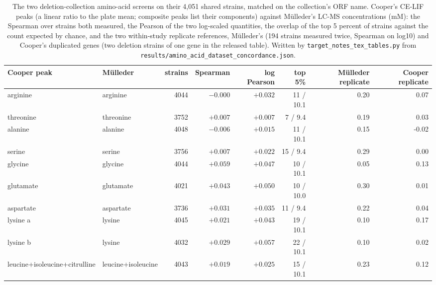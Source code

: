 \begin{table}[H]
  \centering
  \footnotesize
  \caption[M\"ulleder 2016 against Cooper 2010]{The two deletion-collection amino-acid screens on their 4,051 shared strains, matched on the collection's ORF name. Cooper's CE-LIF peaks (a linear ratio to the plate mean; composite peaks list their components) against M\"ulleder's LC-MS concentrations (mM): the Spearman over strains both measured, the Pearson of the two log-scaled quantities, the overlap of the top 5 percent of strains against the count expected by chance, and the two within-study replicate references, M\"ulleder's (194 strains measured twice, Spearman on log10) and Cooper's duplicated genes (two deletion strains of one gene in the released table). Written by \texttt{target\_notes\_tex\_tables.py} from \texttt{results/amino\_acid\_dataset\_concordance.json}.}
  \label{tab:amino-acid-concordance}
  \begin{tabular}{@{}llrrrrrr@{}}
    \hline
    Cooper peak & M\"ulleder & strains & Spearman & log Pearson & top 5\% & M\"ulleder replicate & Cooper replicate \\
    \hline
    arginine & arginine & 4044 & $-0.000$ & $+0.032$ & 11 / 10.1 & 0.20 & 0.07 \\
    threonine & threonine & 3752 & $+0.007$ & $+0.007$ & 7 / 9.4 & 0.19 & 0.03 \\
    alanine & alanine & 4048 & $-0.006$ & $+0.015$ & 11 / 10.1 & 0.15 & -0.02 \\
    serine & serine & 3756 & $+0.007$ & $+0.022$ & 15 / 9.4 & 0.29 & 0.00 \\
    glycine & glycine & 4044 & $+0.059$ & $+0.047$ & 10 / 10.1 & 0.05 & 0.13 \\
    glutamate & glutamate & 4021 & $+0.043$ & $+0.050$ & 10 / 10.0 & 0.30 & 0.01 \\
    aspartate & aspartate & 3736 & $+0.031$ & $+0.035$ & 11 / 9.4 & 0.22 & 0.04 \\
    lysine a & lysine & 4045 & $+0.021$ & $+0.043$ & 19 / 10.1 & 0.10 & 0.17 \\
    lysine b & lysine & 4032 & $+0.029$ & $+0.057$ & 22 / 10.1 & 0.10 & 0.02 \\
    leucine+isoleucine+citrulline & leucine+isoleucine & 4043 & $+0.019$ & $+0.025$ & 15 / 10.1 & 0.23 & 0.12 \\

\end{tabular}
\end{table}
